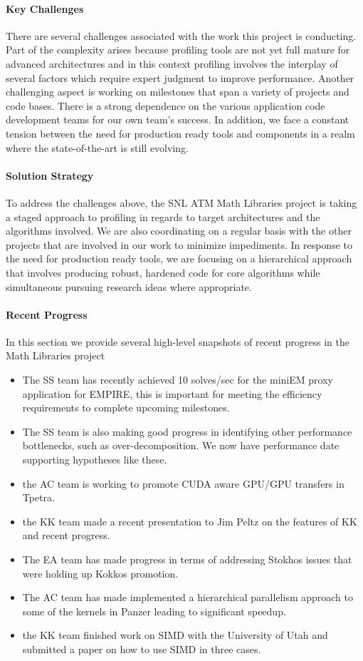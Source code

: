 \paragraph{Key  Challenges}
There are several challenges associated with the work this project is conducting. Part of the complexity arises because profiling tools are not yet full mature for advanced architectures and in this context profiling involves the interplay of several factors which require expert judgment to improve performance.  Another challenging aspect is working on milestones that span a variety of projects and code bases. There is a strong dependence on the various application code development teams for our own team's success. In addition, we face a constant tension between the need for production ready tools and components in a realm where the state-of-the-art is still evolving.

\paragraph{Solution Strategy}
To address the challenges above, the SNL ATM Math Libraries project is taking a staged approach to profiling in regards to target architectures and the algorithms involved. We are also coordinating on a regular basis with the other projects that are involved in our work to minimize impediments. In response to the need for production ready tools, we are focusing on a hierarchical approach that involves producing robust, hardened code for core algorithms while simultaneous pursuing research ideas where appropriate.

\paragraph{Recent Progress}
In this section we provide several high-level snapshots of recent progress in the Math Libraries project
\begin{itemize}
\item The SS team has recently achieved 10 solves/sec for the miniEM proxy application for EMPIRE, this is important for meeting the efficiency requirements to complete upcoming milestones.
\item The SS team is also making good progress in identifying other performance bottlenecks, such as over-decomposition. We now have performance date supporting hypotheses like these.
\item the AC team is working to promote CUDA aware GPU/GPU transfers in Tpetra.
\item the KK team made a recent presentation to Jim Peltz on the features of KK and recent progress.
\item The EA team has made progress in terms of addressing Stokhos issues that were holding up Kokkos promotion.
\item The AC team has made implemented a hierarchical parallelism approach to some of the kernels in Panzer leading to significant speedup.
\item the KK team finished work on SIMD with the University of Utah and submitted a paper on how to use SIMD in three cases.
\end{itemize}

